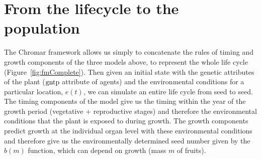 \section{From the lifecycle to the population}
\label{sec:pop}
The Chromar framework allows us simply to concatenate the rules of timing and
growth components of the three models above, to represent the whole life cycle
(Figure~\ref{fig:fmComplete}). Then given an initial state with the genetic
attributes of the plant (\(\mathrm{gntp}\) attribute of agents) and the
environmental conditions for a particular location, \(e(t)\), we can simulate an
entire life cycle from seed to seed. The timing components of the model give us
the timing within the year of the growth period (vegetative + reproductive
stages) and therefore the environmental conditions that the plant is exposed to
during growth. The growth components predict growth at the individual organ
level with these environmental conditions and therefore give us the
environmentally determined seed number given by the \(b(m)\) function, which can
depend on growth (mass $m$ of fruits).

